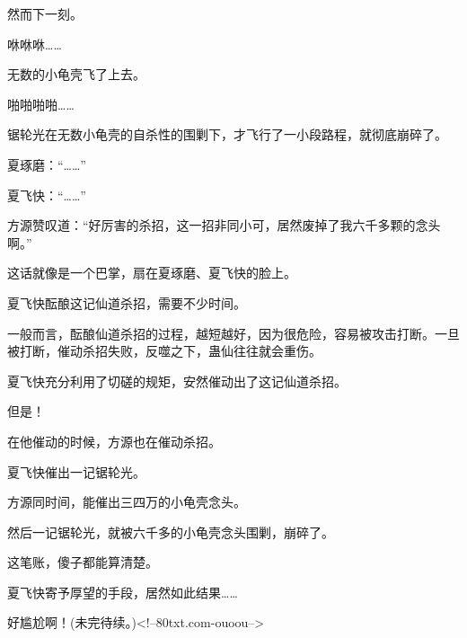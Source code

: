 \begin{this_body}
然而下一刻。

咻咻咻……

无数的小龟壳飞了上去。

啪啪啪啪……

锯轮光在无数小龟壳的自杀性的围剿下，才飞行了一小段路程，就彻底崩碎了。

夏琢磨：“……”

夏飞快：“……”

方源赞叹道：“好厉害的杀招，这一招非同小可，居然废掉了我六千多颗的念头啊。”

这话就像是一个巴掌，扇在夏琢磨、夏飞快的脸上。

夏飞快酝酿这记仙道杀招，需要不少时间。

一般而言，酝酿仙道杀招的过程，越短越好，因为很危险，容易被攻击打断。一旦被打断，催动杀招失败，反噬之下，蛊仙往往就会重伤。

夏飞快充分利用了切磋的规矩，安然催动出了这记仙道杀招。

但是！

在他催动的时候，方源也在催动杀招。

夏飞快催出一记锯轮光。

方源同时间，能催出三四万的小龟壳念头。

然后一记锯轮光，就被六千多的小龟壳念头围剿，崩碎了。

这笔账，傻子都能算清楚。

夏飞快寄予厚望的手段，居然如此结果……

好尴尬啊！(未完待续。)<!--80txt.com-ouoou-->

\end{this_body}

